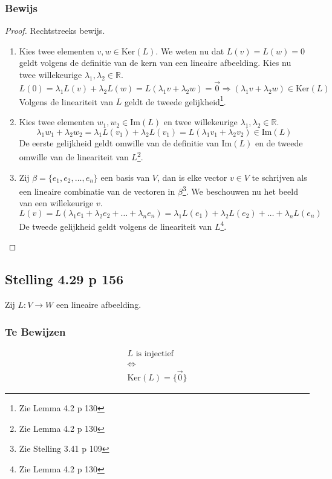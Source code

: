 \documentclass[lineaire_algebra_oplossingen.tex]{subfiles}
\begin{document}
\subsubsection*{Bewijs}
\begin{proof}
Rechtstreeks bewijs.
\begin{enumerate}
\item Kies twee elementen $v,w \in \text{Ker}(L)$. We weten nu dat $L(v)=L(w)=0$ geldt volgens de definitie van de kern van een lineaire afbeelding. Kies nu twee willekeurige $\lambda_1,\lambda_2 \in \mathbb{R}$.
\[
 L(0) = \lambda_1L(v)+\lambda_2L(w) = L(\lambda_1v+\lambda_2w) = \vec{0}
 \Rightarrow  (\lambda_1v+\lambda_2w) \in \text{Ker}(L)
\]
Volgens de lineariteit van $L$ geldt de tweede gelijkheid\footnote{Zie Lemma 4.2 p 130}.

\item Kies twee elementen $w_1,w_2 \in \text{Im}(L)$ en twee willekeurige $\lambda_1,\lambda_2 \in \mathbb{R}$.
\[
\lambda_1w_1+\lambda_2w_2 = \lambda_1L(v_1) + \lambda_2L(v_1) = L(\lambda_1v_1+\lambda_2v_2) \in \text{Im}(L)
\]
De eerste gelijkheid geldt omwille van de definitie van $\text{Im}(L)$ en de tweede omwille van de lineariteit van $L$\footnote{Zie Lemma 4.2 p 130}.

\item Zij $\beta = \{e_1,e_2,\ldots,e_n\}$ een basis van $V$, dan is elke vector $v\in V$ te schrijven als een lineaire combinatie van de vectoren in $\beta$\footnote{Zie Stelling 3.41 p 109}. We beschouwen nu het beeld van een willekeurige $v$.
\[
L(v) = L(\lambda_1e_1+\lambda_2e_2 + \ldots + \lambda_ne_n) = \lambda_1L(e_1)+\lambda_2L(e_2) + \ldots + \lambda_nL(e_n)
\] 
De tweede gelijkheid geldt volgens de lineariteit van $L$\footnote{Zie Lemma 4.2 p 130}.
\end{enumerate}
\end{proof}


\subsection{Stelling 4.29 p 156}
\label{4.29}
Zij $L:V\rightarrow W$ een lineaire afbeelding.

\subsubsection*{Te Bewijzen}
\begin{gather*}
L \text{ is injectief}\\
\Leftrightarrow\\
\text{Ker}(L) = \{\vec{0}\}
\end{gather*}
\end{document}
